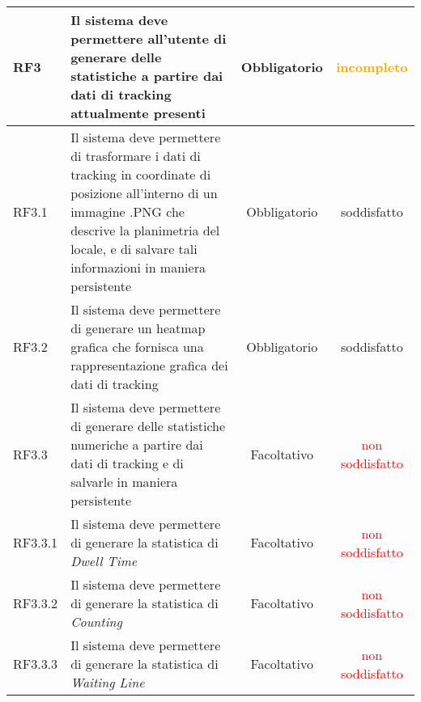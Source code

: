 \begin{center}
\begin{longtable}{ | l | p{5cm} | c | c |}
RF3 & Il sistema deve permettere all'utente di generare delle statistiche a partire dai dati di tracking attualmente presenti & Obbligatorio &  \textcolor{orange}{incompleto}  \\ \hline 
RF3.1 & Il sistema deve permettere di trasformare i dati di tracking in coordinate di posizione all'interno di un immagine .PNG che descrive la planimetria del locale, e di salvare tali informazioni in maniera persistente & Obbligatorio &  \textcolor{green!80!blue}{soddisfatto}  \\ \hline 
RF3.2 & Il sistema deve permettere di generare un heatmap grafica che fornisca una rappresentazione grafica dei dati di tracking & Obbligatorio &  \textcolor{green!80!blue}{soddisfatto}  \\ \hline 
RF3.3 & Il sistema deve permettere di generare delle statistiche numeriche a partire dai dati di tracking e di salvarle in maniera persistente & Facoltativo &  \textcolor{red}{non soddisfatto}  \\ \hline 
RF3.3.1 & Il sistema deve permettere di generare la statistica di \textit{Dwell Time} & Facoltativo &  \textcolor{red}{non soddisfatto}  \\ \hline 
RF3.3.2 & Il sistema deve permettere di generare la statistica di \textit{Counting} & Facoltativo &  \textcolor{red}{non soddisfatto}  \\ \hline 
RF3.3.3 & Il sistema deve permettere di generare la statistica di \textit{Waiting Line} & Facoltativo &  \textcolor{red}{non soddisfatto}  \\ \hline 
\end{longtable}
\end{center}

